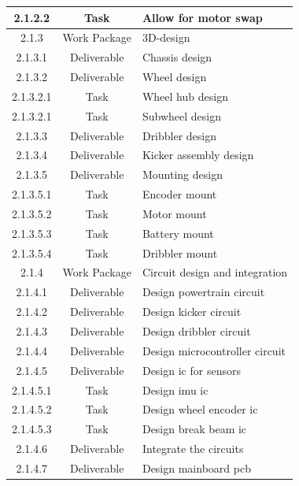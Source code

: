 \begin{longtable}{|c|c|m{}|}
    \rowcolor{c2-t} 2.1.2.2 & Task & Allow for motor swap \\ \hline
    \rowcolor{c2-wp} 2.1.3 & Work Package & 3D-design \\ \hline
    \rowcolor{c2-d} 2.1.3.1 & Deliverable & Chassis design \\ \hline
    \rowcolor{c2-d} 2.1.3.2 & Deliverable & Wheel design \\ \hline
    \rowcolor{c2-t} 2.1.3.2.1 & Task & Wheel hub design \\ \hline
    \rowcolor{c2-t} 2.1.3.2.1 & Task & Subwheel design \\ \hline
    \rowcolor{c2-d} 2.1.3.3 & Deliverable & Dribbler design \\ \hline
    \rowcolor{c2-d} 2.1.3.4 & Deliverable & Kicker assembly design \\ \hline
    \rowcolor{c2-d} 2.1.3.5 & Deliverable & Mounting design \\ \hline
    \rowcolor{c2-t} 2.1.3.5.1 & Task & Encoder mount \\ \hline
    \rowcolor{c2-t} 2.1.3.5.2 & Task & Motor mount \\ \hline
    \rowcolor{c2-t} 2.1.3.5.3 & Task & Battery mount \\ \hline
    \rowcolor{c2-t} 2.1.3.5.4 & Task & Dribbler mount \\ \hline
    \rowcolor{c2-wp} 2.1.4 & Work Package & Circuit design and integration \\ \hline
    \rowcolor{c2-d} 2.1.4.1 & Deliverable & Design powertrain circuit \\ \hline
    \rowcolor{c2-d} 2.1.4.2 & Deliverable & Design kicker circuit \\ \hline
    \rowcolor{c2-d} 2.1.4.3 & Deliverable & Design dribbler circuit \\ \hline
    \rowcolor{c2-d} 2.1.4.4 & Deliverable & Design microcontroller circuit \\ \hline
    \rowcolor{c2-d} 2.1.4.5 & Deliverable & Design \acs{ic} for sensors \\ \hline
    \rowcolor{c2-t} 2.1.4.5.1 & Task & Design \acs{imu} \acs{ic} \\ \hline
    \rowcolor{c2-t} 2.1.4.5.2 & Task & Design wheel encoder \acs{ic} \\ \hline
    \rowcolor{c2-t} 2.1.4.5.3 & Task & Design break beam \acs{ic} \\ \hline
    \rowcolor{c2-d} 2.1.4.6 & Deliverable & Integrate the circuits \\ \hline
    \rowcolor{c2-d} 2.1.4.7 & Deliverable & Design mainboard \acs{pcb} \\ \hline

\end{longtable}
